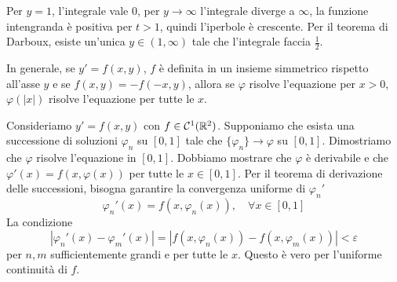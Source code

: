 \documentclass[a4paper]{article}
\begin{document}
\begin{snippetsolution}{}
\begin{enumerate}
\[        \]
        Per \(y=1\), l'integrale vale \(0\), per \(y \to \infty\)
        l'integrale diverge a \(\infty\), la funzione intengranda è positiva per \(t>1\),
        quindi l'iperbole è crescente.
        Per il teorema di Darboux, esiste un'unica \(y\in (1, \infty)\) tale che l'integrale faccia \(\frac12\).
    \end{enumerate}
\end{snippetsolution}

In generale, se \(y'=f(x,y)\), \(f\) è definita in un insieme simmetrico rispetto all'asse \(y\) e se
\(f(x,y) = -f(-x,y)\), allora se \(\varphi\) risolve l'equazione per \(x>0\), \(\varphi(|x|)\) risolve l'equazione per tutte le \(x\).

\begin{snippetexample}{}
    Consideriamo \(y'=f(x,y)\) con \(f \in \mathcal C^1(\mathbb{R}^2)\).
    Supponiamo che esista una successione di soluzioni \(\varphi_n\) su \([0,1]\) tale che
    \(\{\varphi_n\} \to \varphi\) su \([0,1]\).
    Dimostriamo che \(\varphi\) risolve l'equazione in \([0,1]\).
    Dobbiamo mostrare che \(\varphi\) è derivabile e che \(\varphi'(x) = f(x,\varphi(x))\) per tutte le \(x\in[0,1]\).
    Per il teorema di derivazione delle successioni, bisogna garantire la convergenza uniforme di \(\varphi_n'\)
    \[
        \varphi_n'(x) = f(x,\varphi_n(x)), \quad \forall x\in [0,1]
    \]
    La condizione \[
        |\varphi_n'(x) - \varphi_m'(x)| = |f(x,\varphi_n(x)) - f(x,\varphi_m(x))| < \varepsilon
    \]
    per \(n,m\) sufficientemente grandi e per tutte le \(x\).
    Questo è vero per l'uniforme continuità di \(f\).
\end{snippetexample}
\end{document}
